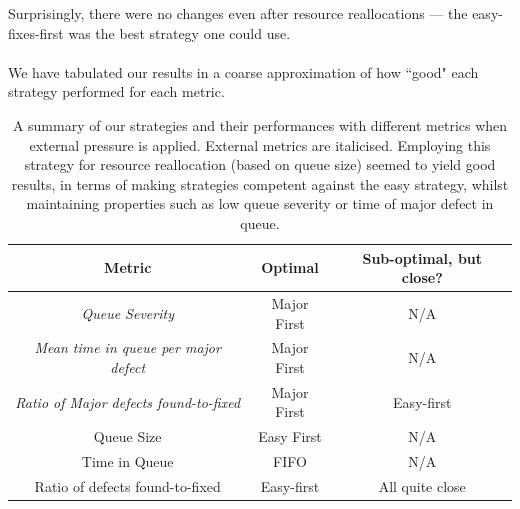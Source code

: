 Surprisingly, there were no changes even after resource reallocations --- the easy-fixes-first was
the best strategy one could use.\\
\\
We have tabulated our results in a coarse approximation of how ``good" each strategy performed for
each metric.

\begin{table}[ht!]
	\centering
	\begin{tabular}{|c|c|c|}
	\hline
	{\bf Metric} & {\bf Optimal} & {\bf Sub-optimal, but close?} \\ \hline
	{\em Queue Severity} & Major First & N/A \\ \hline
	{\em Mean time in queue per major defect} & Major First & N/A\\ \hline
	{\em Ratio of Major defects found-to-fixed} & Major First & Easy-first \\ \hline
	Queue Size & Easy First & N/A \\ \hline
	Time in Queue & FIFO & N/A \\ \hline
	Ratio of defects found-to-fixed & Easy-first & All quite close \\ \hline
	\end{tabular}
	\caption{A summary of our strategies and their performances with different metrics when external
pressure is applied.
External metrics are italicised.
Employing this strategy for resource reallocation (based on queue size) seemed to yield good results, in terms of making
strategies competent against the easy strategy, whilst maintaining properties such as low queue
severity or time of major defect in queue.}
	\label{summaryex}
\end{table}

